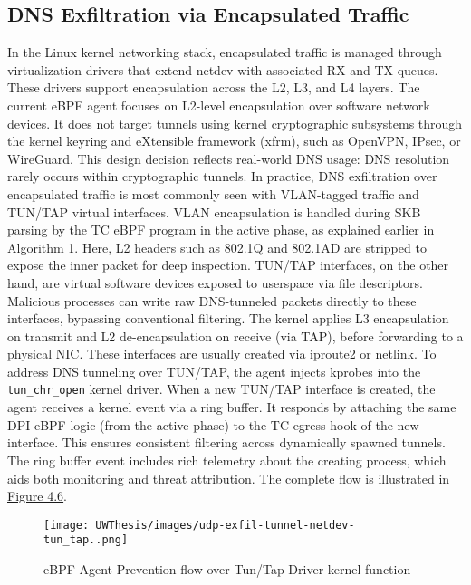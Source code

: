 \documentclass [11pt, proquest] {uwthesis}[2020/02/24]
\begin{document}
\subsection{DNS Exfiltration via Encapsulated Traffic}
\label{sec:encap}
In the Linux kernel networking stack, encapsulated traffic is managed through virtualization drivers that extend netdev with associated RX and TX queues. These drivers support encapsulation across the L2, L3, and L4 layers. The current eBPF agent focuses on L2-level encapsulation over software network devices. It does not target tunnels using kernel cryptographic subsystems through the kernel keyring and eXtensible framework (xfrm), such as OpenVPN, IPsec, or WireGuard. This design decision reflects real-world DNS usage: DNS resolution rarely occurs within cryptographic tunnels. In practice, DNS exfiltration over encapsulated traffic is most commonly seen with VLAN-tagged traffic and TUN/TAP virtual interfaces. VLAN encapsulation is handled during SKB parsing by the TC eBPF program in the active phase, as explained earlier in \hyperref[sec:alg1]{Algorithm 1}. Here, L2 headers such as 802.1Q and 802.1AD are stripped to expose the inner packet for deep inspection. TUN/TAP interfaces, on the other hand, are virtual software devices exposed to userspace via file descriptors. Malicious processes can write raw DNS-tunneled packets directly to these interfaces, bypassing conventional filtering. The kernel applies L3 encapsulation on transmit and L2 de-encapsulation on receive (via TAP), before forwarding to a physical NIC. These interfaces are usually created via iproute2 or netlink. To address DNS tunneling over TUN/TAP, the agent injects kprobes into the \texttt{tun\_chr\_open} kernel driver. When a new TUN/TAP interface is created, the agent receives a kernel event via a ring buffer. It responds by attaching the same DPI eBPF logic (from the active phase) to the TC egress hook of the new interface. This ensures consistent filtering across dynamically spawned tunnels. The ring buffer event includes rich telemetry about the creating process, which aids both monitoring and threat attribution. The complete flow is illustrated in \hyperref[sec:data_plane_tunnel_netdev]{Figure 4.6}.

\begin{figure}[htbp]
\centering
\texttt{[image: UWThesis/images/udp-exfil-tunnel-netdev-tun\_tap..png]}
\caption{eBPF Agent Prevention flow over Tun/Tap Driver kernel function}
\label{sec:data_plane_tunnel_netdev}
\end{figure}
\end{document}
